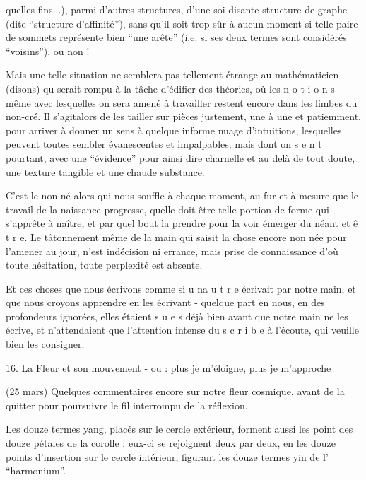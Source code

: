 \margin{\handwritten{\unsure{$\times$|*}}} quelles fins...), parmi d'autres structures, d'une soi-disante structure de graphe (dite ``structure d'affinité''), sans qu'il soit trop sûr à aucun moment si telle paire de sommets représente bien ``une arête'' (i.e. si ses deux termes sont considérés ``voisins''), ou non !

Mais une telle situation ne semblera pas tellement étrange au mathématicien \margin{\handwritten{*}}(disons) qu serait rompu à la tâche d'édifier des théories, où les n o t i o n s même avec lesquelles on sera amené à travailler restent encore dans les limbes du non-cré\leavevmode{}\handwritten{\'{\phantom{e}}}. Il s'agit\unsure{,}alors de les tailler sur pièces justement, une à une et patiemment, pour arriver à donner un sens à quelque informe nuage d'intuitions, lesquelles peuvent toutes sembler évanescentes et impalpables, mais dont on s e n t pourtant, avec une ``évidence'' pour ainsi dire charnelle et au delà de tout doute, une texture tangible et une chaude substance.

C'est le non-né alors qui nous souffle à chaque moment, au fur et à mesure que le travail de la naissance progresse, quelle doit être telle portion de forme qui s'apprête à naître, et par quel bout la prendre pour la voir émerger du néant et ê t r e. Le tâtonnement même de la main qui saisit la chose encore non née pour l'amener au jour, n'est indécision ni errance, mais prise de connaissance d'où toute hésitation, toute perplexité est absente.

Et ces choses que nous écrivons comme si u n\quad a u t r e écrivait par notre main, et que nous croyons apprendre en les écrivant - quelque part en nous, en des profondeurs ignorées, elles étaient s u e s déjà bien avant que notre main ne les écrive, et n'attendaient que l'attention intense du s c r i b e à l'écoute, qui veuille bien les consigner.

16. La Fleur et son mouvement - ou : plus je m'éloigne, plus je m'approche

(25 mars) Quelques commentaires encore sur notre fleur cosmique, avant de la quitter pour poursuivre le fil interrompu de la réflexion.

Les douze termes yang, placés sur le cercle extérieur, forment aussi les point des douze pétales de la corolle : eux-ci se rejoignent deux par deux, en les douze points d'insertion sur le cercle intérieur, figurant les douze termes yin de l' ``harmonium''.

